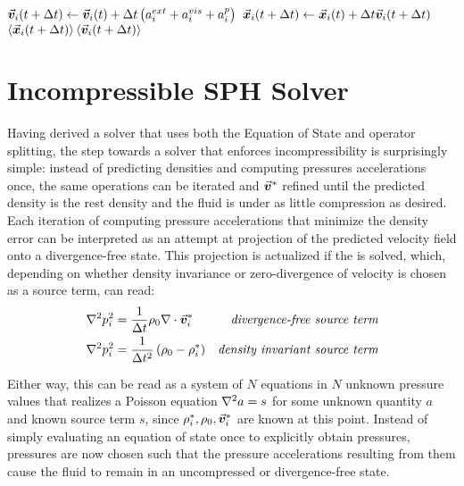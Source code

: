 \begin{algorithm}
\begin{algorithmic}[2]
    \State $\vec{\bm{v}}_i(t+\Delta t) \gets \vec{\bm{v}}_i(t) + \Delta t \left(a_i^{ext} + a_i^{vis} + a_i^{p}\right)$ 
    \State $\vec{\bm{x}}_i(t+\Delta t) \gets \vec{\bm{x}}_i(t) + \Delta t \vec{\bm{v}}_i(t+\Delta t)$ 
    \State\Return $\left\langle\vec{\bm{x}}_i(t+\Delta t)\right\rangle \left\langle\vec{\bm{v}}_i(t+\Delta t)\right\rangle$
    \EndFunction
  \end{algorithmic}
\end{algorithm}

\newpage
\section{Incompressible SPH Solver}\label{sec:incompressible-sph}
Having derived a solver that uses both the Equation of State and operator splitting, the step towards a solver that enforces incompressibility is surprisingly simple: instead of predicting densities and computing pressures accelerations once, the same operations can be iterated and $\vec{\bm{v}}^*$ refined until the predicted density is the rest density and the fluid is under as little compression as desired. Each iteration of computing pressure accelerations that minimize the density error can be interpreted as an attempt at projection of the predicted velocity field onto a divergence-free state\autocite*{2014-sph-sruvey-eurographics}. This projection is actualized if the  is solved, which, depending on whether density invariance or zero-divergence of velocity is chosen as a source term, can read\autocite*{2014-sph-sruvey-eurographics}:
\begin{align}\label{eq:ppe}
  \mathop{}\!\mathbin\nabla^2 p_i^2 & = \frac{1}{\Delta t}\rho_0\nabla\cdot\vec{\bm{v}}_i^*   & \textit{divergence-free source term}   \\
  \mathop{}\!\mathbin\nabla^2 p_i^2 & = \frac{1}{\Delta t^2}\left(\rho_0-\rho_i^*\right) & \textit{density invariant source term}
\end{align}

Either way, this can be read as a system of $N$ equations in $N$ unknown pressure values that realizes a Poisson equation $\mathop{}\!\mathbin\nabla^2 a=s$ for some unknown quantity $a$ and known source term $s$, since $\rho_i^*, \rho_0, \vec{\bm{v}}_i^*$ are known at this point. Instead of simply evaluating an equation of state once to explicitly obtain pressures, pressures are now chosen such that the pressure accelerations resulting from them cause the fluid to remain in an uncompressed or divergence-free state.

